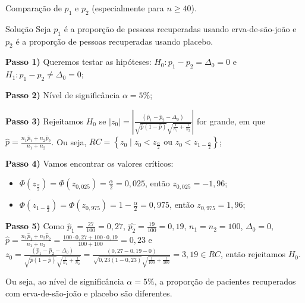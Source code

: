 \documentclass[9pt]{beamer}
\begin{document}
\begin{frame}{Comparação de $p_1$ e $p_2$ (especialmente para $n 
\geq 40$).}

\footnotesize
\begin{block}{Solução}
	Seja $p_1$ é a proporção de pessoas recuperadas usando erva-de-são-joão e $p_2$ é a proporção de pessoas recuperadas usando placebo.
	
	\textbf{Passo 1)} Queremos testar as hipóteses: $H_0: p_1 - p_2 = \Delta_0=0$ e $H_1: p_1 - p_2 \neq \Delta_0=0$;
	
	\textbf{Passo 2)} Nível de significância $\alpha=5\%$;
	
	\textbf{Passo 3)} Rejeitamos $H_0$ se $\lvert z_0 \rvert = \left\lvert \frac{(\hat{p}_1 - \hat{p}_2 - \Delta_0)}{\sqrt{\hat{p}(1 - \hat{p})}\sqrt{\frac{1}{n_1} + \frac{1}{n_2}}} \right\rvert$ for grande, em que $\hat{p} = \frac{n_1 \hat{p}_1 + n_2 \hat{p}_2}{n_1 + n_2}$. Ou seja, $RC = \left\{ z_0 \mid z_0 < z_\frac{\alpha}{2} \mbox{ ou } z_0 < z_{1-\frac{\alpha}{2}} \right\}$;
	
	\textbf{Passo 4)} Vamos encontrar os valores críticos:
	\begin{itemize}
		\item $\Phi\left( z_\frac{\alpha}{2} \right) = \Phi\left( z_{0,025} \right) = \frac{\alpha}{2} = 0,025$, então $z_{0,025} = -1,96$;
		\item $\Phi\left( z_{1-\frac{\alpha}{2}} \right) = \Phi\left( z_{0,975} \right) = 1-\frac{\alpha}{2} = 0,975$, então $z_{0,975} = 1,96$;
	\end{itemize}

	\textbf{Passo 5)} Como $\hat{p}_1 = \frac{27}{100} = 0,27$, $\hat{p_2} = \frac{19}{100}=0,19$, $n_1=n_2=100$, $\Delta_0=0$, $\hat{p} = \frac{n_1 \hat{p}_1 + n_2 \hat{p}_2}{n_1 + n_2} = \frac{100\cdot 0,27 + 100\cdot 0,19}{100 + 100} = 0,23$ e $z_0 = \frac{(\hat{p}_1 - \hat{p}_2 - \Delta_0)}{\sqrt{\hat{p}(1 - \hat{p})}\sqrt{\frac{1}{n_1} + \frac{1}{n_2}}} = \frac{(0,27 - 0,19 - 0)}{\sqrt{0,23(1 - 0,23)}\sqrt{\frac{1}{100} + \frac{1}{100}}} = 3,19 \in RC$, então rejeitamos $H_0$. 
	
	Ou seja, ao nível de significância $\alpha=5\%$, a proporção de pacientes recuperados com erva-de-são-joão e placebo são diferentes.
\end{block}
\normalsize
\end{frame}
\end{document}
